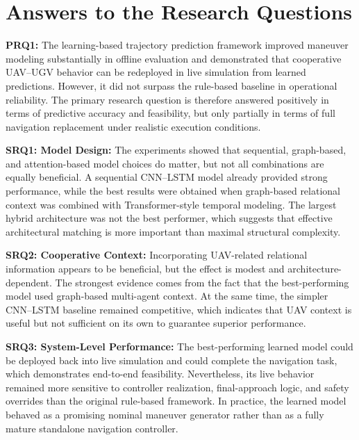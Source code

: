 \section{Answers to the Research Questions}
\textbf{PRQ1:} The learning-based trajectory prediction framework improved maneuver modeling substantially in offline evaluation and demonstrated that cooperative UAV--UGV behavior can be redeployed in live simulation from learned predictions. However, it did not surpass the rule-based baseline in operational reliability. The primary research question is therefore answered positively in terms of predictive accuracy and feasibility, but only partially in terms of full navigation replacement under realistic execution conditions.

\medskip

\textbf{SRQ1: Model Design:} The experiments showed that sequential, graph-based, and attention-based model choices do matter, but not all combinations are equally beneficial. A sequential CNN--LSTM model already provided strong performance, while the best results were obtained when graph-based relational context was combined with Transformer-style temporal modeling. The largest hybrid architecture was not the best performer, which suggests that effective architectural matching is more important than maximal structural complexity.

\medskip

\textbf{SRQ2: Cooperative Context:} Incorporating UAV-related relational information appears to be beneficial, but the effect is modest and architecture-dependent. The strongest evidence comes from the fact that the best-performing model used graph-based multi-agent context. At the same time, the simpler CNN--LSTM baseline remained competitive, which indicates that UAV context is useful but not sufficient on its own to guarantee superior performance.

\medskip

\textbf{SRQ3: System-Level Performance:} The best-performing learned model could be deployed back into live simulation and could complete the navigation task, which demonstrates end-to-end feasibility. Nevertheless, its live behavior remained more sensitive to controller realization, final-approach logic, and safety overrides than the original rule-based framework. In practice, the learned model behaved as a promising nominal maneuver generator rather than as a fully mature standalone navigation controller.

\medskip

